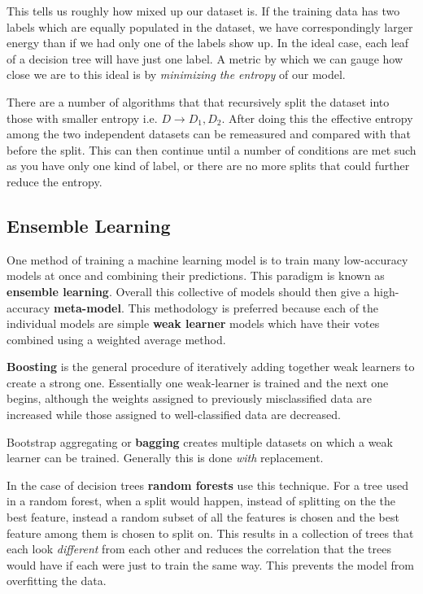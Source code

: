 This tells us roughly how mixed up our dataset is. If the training data has two labels which are equally populated in the dataset, we have correspondingly larger energy than if we had only one of the labels show up. In the ideal case, each leaf of a decision tree will have just one label. A metric by which we can gauge how close we are to this ideal is by \emph{minimizing the entropy} of our model. 

There are a number of algorithms that that recursively split the dataset into those with smaller entropy i.e. $D\rightarrow D_1, D_2$. After doing this the effective entropy among the two independent datasets can be remeasured and compared with that before the split. This can then continue until a number of conditions are met such as you have only one kind of label, or there are no more splits that could further reduce the entropy.


\subsection{Ensemble Learning}

One method of training a machine learning model is to train many low-accuracy models at once and combining their predictions. This paradigm is known as \textbf{ensemble learning}. Overall this collective of models should then give a high-accuracy \textbf{meta-model}. This methodology is preferred because each of the individual models are simple \textbf{weak learner} models which have their votes combined using a weighted average method.

\textbf{Boosting} is the general procedure of iteratively adding together weak learners to create a strong one. Essentially one weak-learner is trained and the next one begins, although the weights assigned to previously misclassified data are increased while those assigned to well-classified data are decreased.

Bootstrap aggregating or \textbf{bagging} creates multiple datasets on which a weak learner can be trained. Generally this is done \emph{with} replacement. 

In the case of decision trees \textbf{random forests} use this technique. For a tree used in a random forest, when a split would happen, instead of splitting on the the best feature, instead a random subset of all the features is chosen and the best feature among them is chosen to split on. This results in a collection of trees that each look \emph{different} from each other and reduces the correlation that the trees would have if each were just to train the same way. This prevents the model from overfitting the data.



